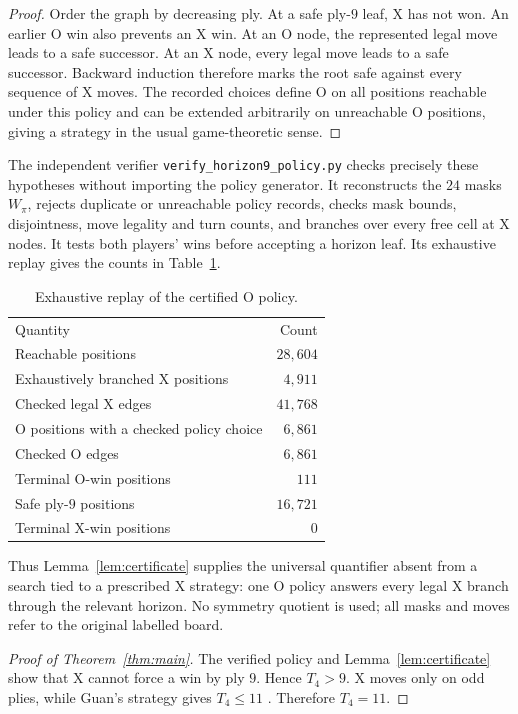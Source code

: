 \documentclass[11pt]{article}
\newcommand{\Tfour}{T_4}
\begin{document}
\begin{proof}
Order the graph by decreasing ply.  At a safe ply-$9$ leaf, X has not won.  An
earlier O win also prevents an X win.  At an O node, the represented legal
move leads to a safe successor.  At an X node, every legal move leads to a
safe successor.  Backward induction therefore marks the root safe against
every sequence of X moves.  The recorded choices define O on all positions
reachable under this policy and can be extended arbitrarily on unreachable O
positions, giving a strategy in the usual game-theoretic sense.
\end{proof}

The independent verifier \texttt{verify\_horizon9\_policy.py} checks precisely
these hypotheses without importing the policy generator.  It reconstructs
the $24$ masks $W_\pi$, rejects duplicate or unreachable policy records,
checks mask bounds, disjointness, move legality and turn counts, and branches
over every free cell at X nodes.  It tests both players' wins before accepting
a horizon leaf.  Its exhaustive replay gives the counts in
Table~\ref{tab:counts}.

\begin{table}[ht]
\centering
\caption{Exhaustive replay of the certified O policy.}
\label{tab:counts}
\begin{tabular}{lr}
Quantity & Count\\
Reachable positions & $28{,}604$\\
Exhaustively branched X positions & $4{,}911$\\
Checked legal X edges & $41{,}768$\\
O positions with a checked policy choice & $6{,}861$\\
Checked O edges & $6{,}861$\\
Terminal O-win positions & $111$\\
Safe ply-$9$ positions & $16{,}721$\\
Terminal X-win positions & $0$\\
\end{tabular}
\end{table}

Thus Lemma~\ref{lem:certificate} supplies the universal quantifier absent
from a search tied to a prescribed X strategy: one O policy answers every
legal X branch through the relevant horizon.  No symmetry quotient is used;
all masks and moves refer to the original labelled board.

\begin{proof}[Proof of Theorem~\ref{thm:main}]
The verified policy and Lemma~\ref{lem:certificate} show that X cannot force a
win by ply $9$.  Hence $\Tfour>9$.  X moves only on odd plies, while Guan's
strategy gives $\Tfour\leq11$ \cite{Guan2026}.  Therefore $\Tfour=11$.
\end{proof}
\end{document}
